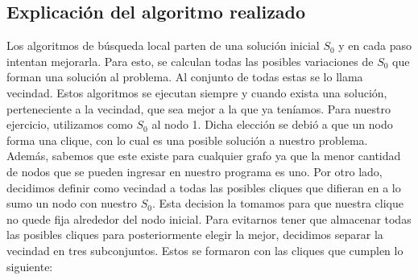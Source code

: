 \subsection{Explicación del algoritmo realizado}
Los algoritmos de búsqueda local parten de una solución inicial $S_{0}$ y en cada paso intentan mejorarla. Para esto, se calculan todas las posibles variaciones de $S_{0}$ que forman una solución al problema. Al conjunto de todas estas se lo llama vecindad. 
Estos algoritmos se ejecutan siempre y cuando exista una solución, perteneciente a la vecindad, que sea mejor a la que ya teníamos. \newline \newline
Para nuestro ejercicio, utilizamos como $S_{0}$ al nodo 1. Dicha elección se debió a que un nodo forma una clique, con lo cual es una posible solución a nuestro problema. Además, sabemos que este existe para cualquier grafo ya que la menor cantidad de nodos que se pueden ingresar en nuestro programa es uno. 
\newline Por otro lado, decidimos definir como vecindad a todas las posibles cliques que difieran en a lo sumo un nodo con nuestro $S_{0}$. Esta decision la tomamos para que nuestra clique no quede fija alrededor del nodo inicial. Para evitarnos tener que almacenar todas las posibles cliques para posteriormente elegir la mejor, decidimos separar la vecindad en tres subconjuntos. Estos se formaron con las cliques que cumplen lo siguiente:
